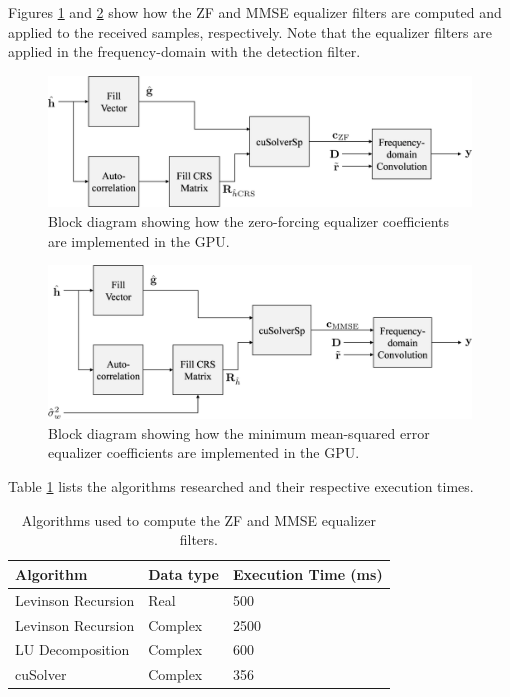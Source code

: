 Figures \ref{fig:blockZF} and \ref{fig:blockMMSE} show how the ZF and MMSE equalizer filters are computed and applied to the received samples, respectively.
Note that the equalizer filters are applied in the frequency-domain with the detection filter.
\begin{figure}
	\centering\includegraphics[width=10.51in/100*55]{figures/eq_GPUimplementation/blockZF.pdf}
	\caption{Block diagram showing how the zero-forcing equalizer coefficients are implemented in the GPU.}
	\label{fig:blockZF}
\end{figure}
\begin{figure}
	\centering\includegraphics[width=10.64in/100*55]{figures/eq_GPUimplementation/blockMMSE.pdf}
	\caption{Block diagram showing how the minimum mean-squared error equalizer coefficients are implemented in the GPU.}
	\label{fig:blockMMSE}
\end{figure}
Table \ref{tab:ZFMMSEtimingComparison} lists the algorithms researched and their respective execution times.
\begin{table}
\caption{Algorithms used to compute the ZF and MMSE equalizer filters.}
\begin{center}
\begin{tabular}{lll}
	\toprule
	Algorithm 			& Data type	& Execution Time (ms)	\\ \midrule
	Levinson Recursion 	& Real	 	& 500 					\\
	Levinson Recursion 	& Complex 	& 2500 					\\
	LU Decomposition 	& Complex 	& 600				 	\\
	cuSolver			& Complex	& 356				\\
	\bottomrule
\end{tabular}
\end{center}
\label{tab:ZFMMSEtimingComparison}
\end{table}

